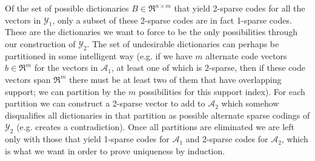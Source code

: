 \documentclass{article}
\begin{document}
Of the set of possible dictionaries $B \in \Re^{n \times m}$ that yield 2-sparse codes for all the vectors in $\mathcal{Y}_1$, only a subset of these 2-sparse codes are in fact 1-sparse codes. These are the dictionaries we want to force to be the only possibilities through our construction of $\mathcal{Y}_2$. The set of undesirable dictionaries can perhaps be partitioned in some intelligent way (e.g. if we have $m$ alternate code vectors $b \in \Re^m$ for the vectors in $\mathcal{A}_1$, at least one of which is 2-sparse, then if these code vectors span $\Re^m$ there must be at least two of them that have overlapping support; we can partition by the $m$ possibilities for this support index). For each partition we can construct a 2-sparse vector to add to $\mathcal{A}_2$ which somehow disqualifies all dictionaries in that partition as possible alternate sparse codings of $\mathcal{Y}_2$ (e.g. creates a contradiction). Once all partitions are eliminated we are left only with those that yield 1-sparse codes for $\mathcal{A}_1$ and 2-sparse codes for $\mathcal{A}_2$, which is what we want in order to prove uniqueness by induction. 
\end{document}
